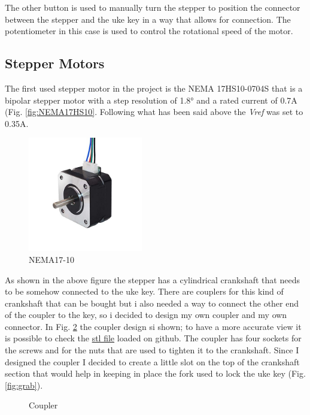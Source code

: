 \documentclass[a4paper,12pt]{article}
\begin{document}
\begin{multicols}{2}
The other button is used to manually turn the stepper to position the connector between the stepper and the uke key in a way that allows for connection. The potentiometer in this case is used to control the rotational speed of the motor.
\subsection{Stepper Motors}
The first used stepper motor in the project is the NEMA 17HS10-0704S that is a bipolar stepper motor with a step resolution of 1.8° and a rated current of 0.7A (Fig. \ref{fig:NEMA17HS10}. Following what has been said above the \textit{Vref} was set to 0.35A.
\begin{figure}[H]
    \begin{center}
        \includegraphics[width=5cm]{images/nema17-10.jpg}
        \caption{NEMA17-10}
        \label{fig:NEMA17-10}
    \end{center}
\end{figure}
As shown in the above figure the stepper has a cylindrical crankshaft that needs to be somehow connected to the uke key. There are couplers for this kind of crankshaft that can be bought but i also needed a way to connect the other end of the coupler to the key, so i decided to design my own coupler and my own connector. In Fig. \ref{fig:coupler} the coupler design si shown; to have a more accurate view it is possible to check the \href{https://github.com/Prop4et/LoM_Uketuner/blob/master/3D/coupler_part.stl}{stl file} loaded on github. The coupler has four sockets for the screws and for the nuts that are used to tighten it to the crankshaft. Since I designed the coupler I decided to create a little slot on the top of the crankshaft section that would help in keeping in place the fork used to lock the uke key (Fig. \ref{fig:grab}).
\begin{figure}[H]
    \centering
    \caption{Coupler}
    \label{fig:coupler}
\end{figure}

\end{multicols}
\end{document}
